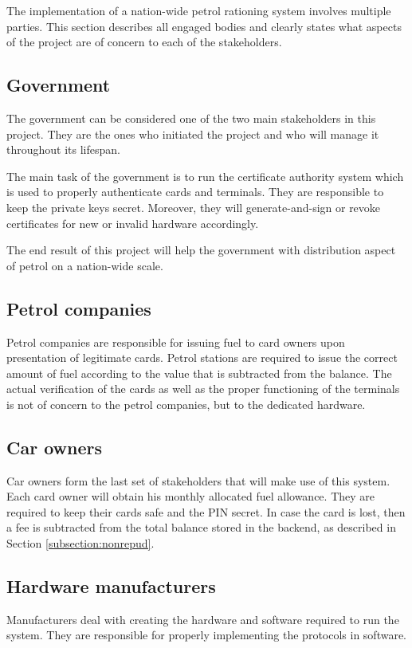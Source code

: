 The implementation of a nation-wide petrol rationing system involves multiple parties. This section describes all engaged bodies and clearly states what aspects of the project are of concern to each of the stakeholders.

\subsection{Government}

The government can be considered one of the two main stakeholders in this project. They are the ones who initiated the project and who will manage it throughout its lifespan.

The main task of the government is to run the certificate authority system which is used to properly authenticate cards and terminals. They are responsible to keep the private keys secret. Moreover, they will generate-and-sign or revoke certificates for new or invalid hardware accordingly.

The end result of this project will help the government with distribution aspect of petrol on a nation-wide scale.

\subsection{Petrol companies}

Petrol companies are responsible for issuing fuel to card owners upon presentation of legitimate cards. Petrol stations are required to issue the correct amount of fuel according to the value that is subtracted from the balance. The actual verification of the cards as well as the proper functioning of the terminals is not of concern to the petrol companies, but to the dedicated hardware.

\subsection{Car owners}

Car owners form the last set of stakeholders that will make use of this system. Each card owner will obtain his monthly allocated fuel allowance. They are required to keep their cards safe and the PIN secret. In case the card is lost, then a fee is subtracted from the total balance stored in the backend, as described in Section \ref{subsection:nonrepud}.

\subsection{Hardware manufacturers}

Manufacturers deal with creating the hardware and software required to run the system. They are responsible for properly implementing the protocols in software.
